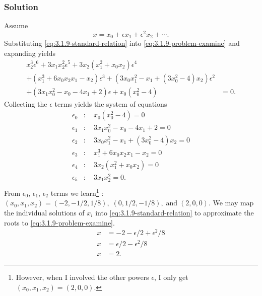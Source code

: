 \documentclass[12pt,twoside]{article}
\begin{document}
\subsubsection*{Solution}
Assume
\begin{equation}
  \label{eq:3.1.9-standard-relation}
  x=x_0+\epsilon x_1 + \epsilon^2x_2+\cdots.
\end{equation}
Substituting \cref{eq:3.1.9-standard-relation} into
\cref{eq:3.1.9-problem-examine} and expanding yields
\begin{equation}
  \label{eq:3.1.9-system}
  \begin{split}
    x_2^3 \epsilon ^6+3 x_1 x_2^2 \epsilon ^5
    +3 x_2 \left(x_1^2+x_0 x_2\right) \epsilon ^4 \\
    +\left(x_1^3+6 x_0 x_2 x_1-x_2\right) \epsilon ^3
    +\left(3 x_0 x_1^2-x_1+\left(3 x_0^2-4\right) x_2\right) \epsilon ^2 \\
    +\left(3 x_1 x_0^2-x_0-4 x_1+2\right) \epsilon
    +x_0 \left(x_0^2-4\right) &=0.
  \end{split}
\end{equation}
Collecting the $\epsilon$ terms yields the system of equations
\begin{equation}
  \label{eq:3.1.9-expansion}
  \begin{aligned}
    \epsilon_0 &:\quad x_0 \left(x_0^2-4\right)=0 \\
    \epsilon_1 &:\quad 3x_1 x_0^2-x_0-4 x_1+2=0 \\
    \epsilon_2 &:\quad 3x_0 x_1^2-x_1+\left(3 x_0^2-4\right) x_2=0 \\
    \epsilon_3 &:\quad x_1^3+6 x_0 x_2 x_1-x_2=0 \\
    \epsilon_4 &:\quad 3x_2 \left(x_1^2+x_0 x_2\right)=0 \\
    \epsilon_5 &:\quad 3x_1 x_2^2=0. \\
  \end{aligned}
\end{equation}
From $\epsilon_0$, $\epsilon_1$, $\epsilon_2$ terms we learn\footnote{However,
  when I involved the other powers $\epsilon$, I only get $(x_0,x_1,x_2)
  =(2,0,0).$} : $(x_0,x_1,x_2) =(-2, -1/2, 1/8),\; (0,1/2,-1/8), \;\text{and}\;
(2, 0, 0)$. We may map the individual solutions of $x_i$ into
\cref{eq:3.1.9-standard-relation} to approximate the roots to
\cref{eq:3.1.9-problem-examine}.
\begin{equation*}
  \begin{aligned}
    x &= -2 - \epsilon/2 + \epsilon^2/8 \\
    x &= \epsilon/2 - \epsilon^2/8 \\
    x &= 2.
  \end{aligned}
\end{equation*}
\end{document}

